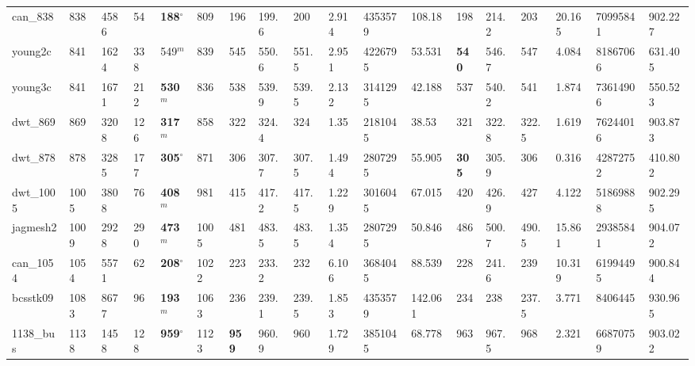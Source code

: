 \begin{table}[h!]
{\begin{tabular}{llllllllllllllllll}
            can\_838 & 838 & 4586 & 54 & \textbf{188}$^{\circ}$ & 809 & 196 & 199.6 & 200 & 2.914 & 4353579 & 108.18 & 198 & 214.2 & 203 & 20.165 & 70995841 & 902.227 \\
            young2c & 841 & 1624 & 338 & 549$^{m}$ & 839 & 545 & 550.6 & 551.5 & 2.951 & 4226795 & 53.531 & \textbf{540} & 546.7 & 547 & 4.084 & 81867066 & 631.405 \\
            young3c & 841 & 1671 & 212 & \textbf{530}$^{m}$ & 836 & 538 & 539.9 & 539.5 & 2.132 & 3141295 & 42.188 & 537 & 540.2 & 541 & 1.874 & 73614906 & 550.523 \\
            dwt\_869 & 869 & 3208 & 126 & \textbf{317}$^{m}$ & 858 & 322 & 324.4 & 324 & 1.35 & 2181045 & 38.53 & 321 & 322.8 & 322.5 & 1.619 & 76244016 & 903.873 \\
            dwt\_878 & 878 & 3285 & 177 & \textbf{305}$^{\circ}$ & 871 & 306 & 307.7 & 307.5 & 1.494 & 2807295 & 55.905 & \textbf{305} & 305.9 & 306 & 0.316 & 42872752 & 410.802 \\
            dwt\_1005 & 1005 & 3808 & 76 & \textbf{408}$^{m}$ & 981 & 415 & 417.2 & 417.5 & 1.229 & 3016045 & 67.015 & 420 & 426.9 & 427 & 4.122 & 51869888 & 902.295 \\
            jagmesh2 & 1009 & 2928 & 290 & \textbf{473}$^{m}$ & 1005 & 481 & 483.5 & 483.5 & 1.354 & 2807295 & 50.846 & 486 & 500.7 & 490.5 & 15.861 & 29385841 & 904.072 \\
            can\_1054 & 1054 & 5571 & 62 & \textbf{208}$^{\circ}$ & 1022 & 223 & 233.2 & 232 & 6.106 & 3684045 & 88.539 & 228 & 241.6 & 239 & 10.319 & 61994495 & 900.844 \\
            bcsstk09 & 1083 & 8677 & 96 & \textbf{193}$^{m}$ & 1063 & 236 & 239.1 & 239.5 & 1.853 & 4353579 & 142.061 & 234 & 238 & 237.5 & 3.771 & 8406445 & 930.965 \\
            1138\_bus & 1138 & 1458 & 128 & \textbf{959}$^{\circ}$ & 1123 & \textbf{959} & 960.9 & 960 & 1.729 & 3851045 & 68.778 & 963 & 967.5 & 968 & 2.321 & 66870759 & 903.022 \\
            \bottomrule
        \end{tabular}
    }{
}
\end{table}

